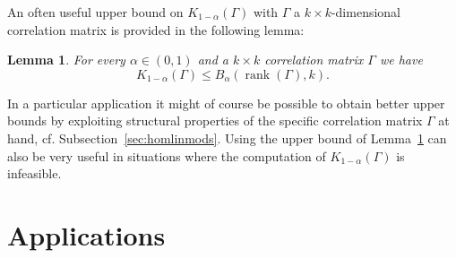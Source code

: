 \documentclass[preprint]{imsart}
\DeclareMathOperator{\rank}{rank}
\newtheorem{lemma}[theorem]{Lemma}
\numberwithin{equation}{section}
\begin{document}
An often useful upper bound on $K_{1-\alpha}(\Gamma)$ with $\Gamma$ a $k \times k$-dimensional correlation matrix is provided in the following lemma:

\begin{lemma} \label{lem:upper}
For every $\alpha \in (0, 1)$ and a $k \times k$ correlation matrix $\Gamma$ we have
\[
K_{1-\alpha}(\Gamma)
\leq 
B_{\alpha}(\rank(\Gamma),k). 
\]
\end{lemma}
%
In a particular application it might of course be possible to obtain better upper bounds by exploiting structural properties of the specific correlation matrix $\Gamma$ at hand, cf. Subsection~\ref{sec:homlinmods}. Using the upper bound of Lemma~\ref{lem:upper} can also be very useful in situations where the computation of $K_{1-\alpha}(\Gamma)$ is infeasible.



\section{Applications}
\label{sec:applications}
\end{document}
